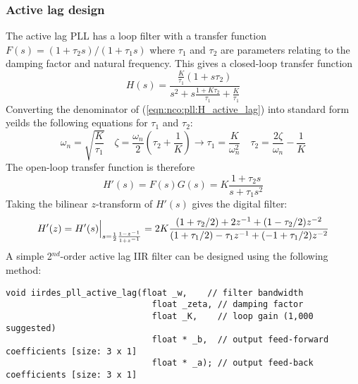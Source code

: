 \subsubsection{Active lag design}
\label{module:nco:pll:active_lag}
The active lag PLL \cite{Best:1997} has a loop filter with a transfer
function
$F(s) = (1 + \tau_2 s)/(1 + \tau_1 s)$
where $\tau_1$ and $\tau_2$ are parameters relating to the damping
factor and natural frequency.
%
This gives a closed-loop transfer function
%
\begin{equation}
\label{eqn:nco:pll:H_active_lag}
    H(s) = \frac{
                \frac{K}{\tau_1} (1 + s\tau_2)
           } {
                s^2 + s\frac{1 + K\tau_2}{\tau_1} + \frac{K}{\tau_1}
           }
\end{equation}
%
Converting the denominator of (\ref{eqn:nco:pll:H_active_lag}) into
standard form yeilds the following equations for $\tau_1$ and $\tau_2$:
%
\begin{equation}
    \omega_n = \sqrt{\frac{K}{\tau_1}}
    \,\,\,\,\,\,
    \zeta = \frac{\omega_n}{2}\left(\tau_2 + \frac{1}{K}\right)
        \rightarrow
    \tau_1 = \frac{K}{\omega_n^2}
    \,\,\,\,\,\,
    \tau_2 = \frac{2\zeta}{\omega_n} - \frac{1}{K}
\end{equation}
%
The open-loop transfer function is therefore
\begin{equation}
    H'(s) = F(s)G(s) = K \frac{1 + \tau_2 s}{s + \tau_1 s^2}
\end{equation}
%
Taking the bilinear $z$-transform of $H'(s)$ gives the digital filter:
%
\begin{equation}
    H'(z) = H'(s)\Bigl.\Bigr|_{s = \frac{1}{2}\frac{1-z^{-1}}{1+z^{-1}}}
          = 2 K \frac{
                (1+\tau_2/2) + 2 z^{-1}     + ( 1 - \tau_2/2)z^{-2}
          } {
                (1+\tau_1/2) -\tau_1 z^{-1} + (-1 + \tau_1/2)z^{-2}
          }
\end{equation}
%
A simple 2$^{nd}$-order active lag IIR filter can be designed using the
following method:
%
\begin{Verbatim}[fontsize=\small]
  void iirdes_pll_active_lag(float _w,    // filter bandwidth
                             float _zeta, // damping factor
                             float _K,    // loop gain (1,000 suggested)
                             float * _b,  // output feed-forward coefficients [size: 3 x 1]
                             float * _a); // output feed-back coefficients [size: 3 x 1]
\end{Verbatim}
%



